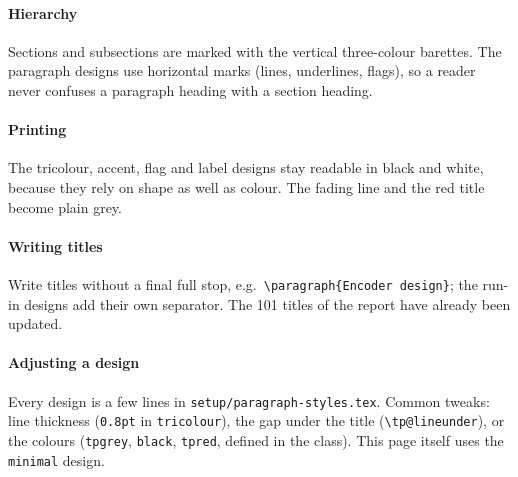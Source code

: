 \documentclass[en]{telereport}           %
\begin{document}
\paragraph{Hierarchy} Sections and subsections are marked with the vertical three-colour
barettes. The paragraph designs use horizontal marks (lines, underlines, flags), so a reader
never confuses a paragraph heading with a section heading.

\paragraph{Printing} The tricolour, accent, flag and label designs stay readable in black and
white, because they rely on shape as well as colour. The fading line and the red title become
plain grey.

\paragraph{Writing titles} Write titles without a final full stop, e.g.\
\texttt{\textbackslash paragraph\{Encoder design\}}; the run-in designs add their own
separator. The 101 titles of the report have already been updated.

\paragraph{Adjusting a design} Every design is a few lines in
\texttt{setup/paragraph-styles.tex}. Common tweaks: line thickness (\texttt{0.8pt} in
\texttt{tricolour}), the gap under the title (\texttt{\textbackslash tp@lineunder}), or the
colours (\texttt{tpgrey}, \texttt{black}, \texttt{tpred}, defined in the class). This page
itself uses the \texttt{minimal} design.
\end{document}
